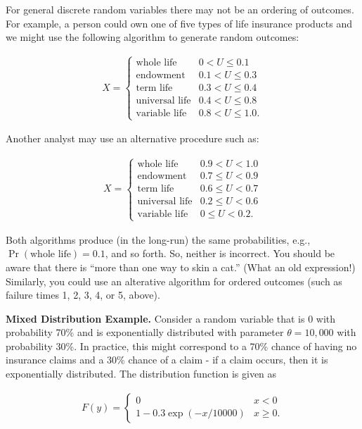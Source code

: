 \documentclass[]{book}
\theoremstyle{definition}
\theoremstyle{definition}
\theoremstyle{definition}
\theoremstyle{remark}
\begin{document}
For general discrete random variables there may not be an ordering of
outcomes. For example, a person could own one of five types of life
insurance products and we might use the following algorithm to generate
random outcomes:

\[\begin{aligned}
X = \left\{ \begin{array}{cc}
  \textrm{whole life} &   0<U  \leq 0.1  \\
 \textrm{endowment} &  0.1 < U  \leq  0.3\\
\textrm{term life} &  0.3 < U  \leq  0.4\\
  \textrm{universal life} &  0.4 < U  \leq  0.8  \\
  \textrm{variable life} &  0.8 < U  \leq  1.0 .
            \end{array} \right.\end{aligned}\]

Another analyst may use an alternative procedure such as:

\[\begin{aligned}
X = \left\{ \begin{array}{cc}
  \textrm{whole life} &   0.9<U<1.0  \\
 \textrm{endowment} &  0.7 \leq U < 0.9\\
\textrm{term life} &  0.6 \leq U < 0.7\\
  \textrm{universal life} &  0.2 \leq U < 0.6  \\
  \textrm{variable life} &  0 \leq U < 0.2 .
            \end{array} \right.\end{aligned}\]

Both algorithms produce (in the long-run) the same probabilities, e.g.,
\(\Pr(\textrm{whole life})=0.1\), and so forth. So, neither is
incorrect. You should be aware that there is ``more than one way to skin
a cat.'' (What an old expression!) Similarly, you could use an
alterative algorithm for ordered outcomes (such as failure times 1, 2,
3, 4, or 5, above).

\textbf{Mixed Distribution Example.} Consider a random variable that is
0 with probability 70\% and is exponentially distributed with parameter
\(\theta= 10,000\) with probability 30\%. In practice, this might
correspond to a 70\% chance of having no insurance claims and a 30\%
chance of a claim - if a claim occurs, then it is exponentially
distributed. The distribution function is given as

\[\begin{aligned}
F(y) = \left\{ \begin{array}{cc}
              0 &  x<0  \\
              1 - 0.3 \exp(-x/10000) & x \ge 0 .
            \end{array} \right.\end{aligned}\]
\end{document}
